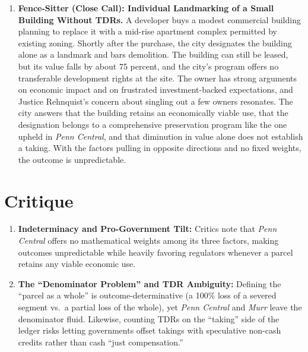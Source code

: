 \documentclass[12pt]{article}
\begin{document}
\begin{enumerate}
\item \textbf{Fence-Sitter (Close Call): Individual Landmarking of a Small Building Without TDRs.} A developer buys a modest commercial building planning to replace it with a mid-rise apartment complex permitted by existing zoning. Shortly after the purchase, the city designates the building alone as a landmark and bars demolition. The building can still be leased, but its value falls by about 75 percent, and the city's program offers no transferable development rights at the site. The owner has strong arguments on economic impact and on frustrated investment-backed expectations, and Justice Rehnquist's concern about singling out a few owners resonates. The city answers that the building retains an economically viable use, that the designation belongs to a comprehensive preservation program like the one upheld in \textit{Penn Central}, and that diminution in value alone does not establish a taking. With the factors pulling in opposite directions and no fixed weights, the outcome is unpredictable.

\end{enumerate}

\section{Critique}
\begin{enumerate}
  \item \textbf{Indeterminacy and Pro-Government Tilt:} Critics note that \textit{Penn Central} offers no mathematical weights among its three factors, making outcomes unpredictable while heavily favoring regulators whenever a parcel retains any viable economic use.
  \item \textbf{The ``Denominator Problem'' and TDR Ambiguity:} Defining the ``parcel as a whole'' is outcome-determinative (a 100\% loss of a severed segment vs.\ a partial loss of the whole), yet \textit{Penn Central} and \textit{Murr} leave the denominator fluid. Likewise, counting TDRs on the ``taking'' side of the ledger risks letting governments offset takings with speculative non-cash credits rather than cash ``just compensation.''
\end{enumerate}
\end{document}
